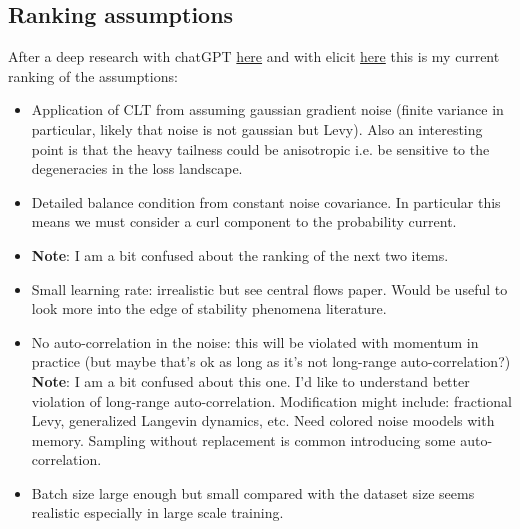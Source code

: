 \documentclass[11pt]{article}
\begin{document}
\subsection{Ranking assumptions}
After a deep research with chatGPT \href{https://chatgpt.com/s/dr_6853372e8bf48191913b0ad54514ca1b}{here} and with elicit \href{https://elicit.com/review/6aefb134-7070-4a9f-bb6d-6f86dff484ac}{here} this is my current ranking of the assumptions:
\begin{itemize}
    \item Application of CLT from assuming gaussian gradient noise (finite variance in particular, likely that noise is not gaussian but Levy). Also an interesting point is that the heavy tailness could be anisotropic i.e. be sensitive to the degeneracies in the loss landscape.
    \item Detailed balance condition from constant noise covariance. In particular this means we must consider a curl component to the probability current.
    \item \textbf{Note}: I am a bit confused about the ranking of the next two items.
    \item Small learning rate: irrealistic but see central flows paper. Would be useful to look more into the edge of stability phenomena literature.
    \item No auto-correlation in the noise: this will be violated with momentum in practice (but maybe that's ok as long as it's not long-range auto-correlation?) \textbf{Note}: I am a bit confused about this one. I'd like to understand better violation of long-range auto-correlation. Modification might include: fractional Levy, generalized Langevin dynamics, etc. Need colored noise moodels with memory. Sampling without replacement is common introducing some auto-correlation.
    \item Batch size large enough but small compared with the dataset size seems realistic especially in large scale training.
\end{itemize}
\end{document}
